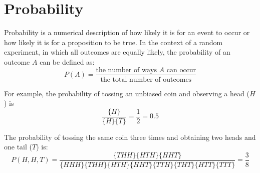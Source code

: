 \chapter{Probability}
\label{ch:probability}

Probability is a numerical description of how likely it is for an
event to occur or how likely it is for a proposition to be true.  In
the context of a random experiment, in which all outcomes are equally
likely, the probability of an outcome $A$ can be defined as:
\begin{equation}
P(A) = \frac{\mbox{the number of ways }A\mbox{ can occur}}
{\mbox{the total number of outcomes}}
\end{equation}

For example, the probability of tossing an unbiased coin and observing
a head ($H$) is
\[
\frac{
  \{H\}
}{
  \{H\}\{T\}
} = \frac{1}{2} = 0.5
\]

The probability of tossing the same coin three times and obtaining two
heads and one tail ($T$) is:
\begin{equation}
  P(H,H,T) =
  \frac{
    \{THH\}\{HTH\}\{HHT\}
  }{
    \{HHH\}\{THH\}\{HTH\}\{HHT\}\{TTH\}\{THT\}\{HTT\}\{TTT\}
  } = \frac{3}{8}
  \label{eq:2H1T}
\end{equation}


